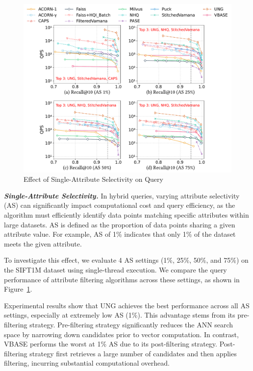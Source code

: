 \documentclass[sigconf, nonacm]{acmart}
\begin{document}
	\begin{figure}
		\centering
		\setlength{\abovecaptionskip}{0.1cm}
		\setlength{\belowcaptionskip}{-0.1cm}
		\includegraphics[width=0.95\columnwidth]{figures/exp/exp_5_1_1_SingleLabel_1thread.pdf}
		\caption{Effect of Single-Attribute Selectivity on Query}
		\label{fig:exp_5_1_1_SingleLabel_1thread}
	\end{figure}
	
	
	\textit{\textbf{Single-Attribute Selectivity.}}
	In hybrid queries, varying attribute selectivity (AS) can significantly impact computational cost and query efficiency, as the algorithm must efficiently identify data points matching specific attributes within large datasets. AS is defined as the proportion of data points sharing a given attribute value. For example, AS of 1\% indicates that only 1\% of the dataset meets the given attribute. 
	
	To investigate this effect, we evaluate 4 AS settings (1\%, 25\%, 50\%, and 75\%) on the SIFT1M dataset using single-thread execution. We compare the query performance of attribute filtering algorithms across these settings, as shown in Figure~\ref{fig:exp_5_1_1_SingleLabel_1thread}.
	
	Experimental results show that UNG achieves the best performance across all AS settings, especially at extremely low AS (1\%). 
	This advantage stems from its pre-filtering strategy. Pre-filtering strategy significantly reduces the ANN search space by narrowing down candidates prior to vector computation. In contrast, VBASE performs the worst at 1\% AS due to its post-filtering strategy. Post-filtering strategy first retrieves a large number of candidates and then applies filtering, incurring substantial computational overhead.
	
\end{document}
